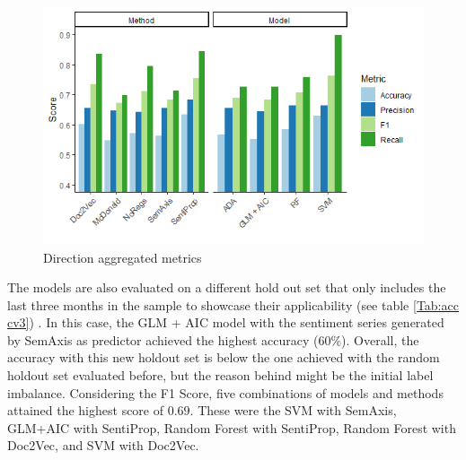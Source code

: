 \documentclass[a4paper, 12pt]{report}
\begin{document}
    \begin{figure}[H]
    \centering
    \includegraphics[scale = 0.7]{graphs/Dir_Agg.png}
    \caption{Direction aggregated metrics}
    \label{Fig:diragg}
    \end{figure}
    
    
    The models are also evaluated on a different hold out set that only includes the last three months in the sample to showcase their applicability (see table \ref{Tab:acc cv3}) . In this case, the GLM + AIC model with the sentiment series generated by SemAxis as predictor achieved the highest accuracy (60$\%$). Overall, the accuracy with this new holdout set is below the one achieved with the random holdout set evaluated before, but the reason behind might be the initial label imbalance. Considering the F1 Score, five combinations of models and methods attained the highest score of $0.69$. These were the SVM with SemAxis, GLM+AIC with SentiProp, Random Forest with SentiProp, Random Forest with Doc2Vec, and SVM with Doc2Vec. 
    
    
\end{document}
